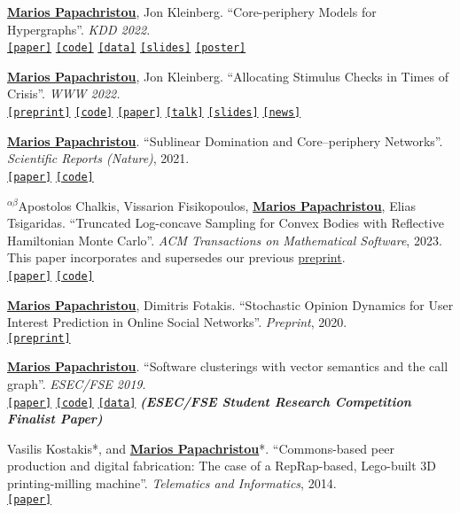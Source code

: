 \documentclass[margin]{res}
\newcommand{\alphabeticalorder}[0]{\ensuremath {^{\alpha \beta}}}
\newcommand{\specialurl}[2]{\href {#2} {\texttt{[#1]}}}
\newcommand{\preprint}[1]{\specialurl {preprint} {#1}}
\newcommand{\code}[1]{\specialurl {code} {#1}}
\newcommand{\data}[1]{\specialurl {data} {#1}}
\newcommand{\talk}[1]{\specialurl {talk} {#1}}
\newcommand{\slides}[1]{\specialurl {slides} {#1}}
\newcommand{\poster}[1]{\specialurl {poster} {#1}}
\newcommand{\paper}[1]{\specialurl {paper} {#1}}
\newcommand{\authorref}[1]{\underline {\textbf{#1}}}
\newcommand{\news}[1]{\specialurl {news} {#1}}
\newcommand{\authorme}{\authorref{Marios Papachristou}}
\begin{document}
\begin{resume}
\begin{compactenum}
   \item \authorme, Jon Kleinberg. ``Core-periphery Models for Hypergraphs''. \emph{KDD 2022.} \\
   \paper{https://arxiv.org/abs/2206.00783} \code{https://doi.org/10.5281/zenodo.5965849} \data{https://doi.org/10.5281/zenodo.5943043} \slides{https://drive.google.com/file/d/1k9pjPaeDtg7jhUivjlEmyunimcUb-DxL/view?usp=sharing} \poster{https://drive.google.com/file/d/1RJ3C7KKhTemfj5OBAiEXUHMVp-TJhTDs/view?usp=sharing}
   \item  \authorme, Jon Kleinberg. ``Allocating Stimulus Checks in Times of Crisis''. \emph{WWW 2022.} \\\preprint{https://arxiv.org/abs/2106.07560} \code{https://github.com/papachristoumarios/financial-contagion} \paper{https://doi.org/10.1145/3485447.3512047} \talk{https://youtu.be/WUmPBztK8Mo} \slides{https://drive.google.com/file/d/1v4v4jPOTzFtP8a5dhAFLoIjZSRDxAjBz/view?usp=sharing} \news{https://www.minneapolisfed.org/article/2022/social-policy-in-the-age-of-algorithms-an-interview-with-jon-kleinberg}   
   \item \authorme. ``Sublinear Domination and Core--periphery Networks''. \emph{Scientific Reports (Nature)}, 2021. \\ \paper{http://www.nature.com/articles/s41598-021-94105-8} \code{https://bit.ly/3wKNGI0} 
    \item \alphabeticalorder Apostolos Chalkis, Vissarion Fisikopoulos, \authorme, Elias Tsigaridas. ``Truncated Log-concave Sampling for Convex Bodies with Reflective Hamiltonian Monte Carlo''.   \emph{ACM Transactions on Mathematical Software}, 2023. This paper incorporates and supersedes our previous \href{https://arxiv.org/abs/2102.13068}{preprint}. \\ \paper{https://doi.org/10.1145/3589505} \code{https://github.com/GeomScale/volume_approximation}
    \item \authorme, Dimitris Fotakis. ``Stochastic Opinion Dynamics for User Interest Prediction in Online Social Networks''.  \emph{Preprint}, 2020. \\ \preprint{https://www.researchgate.net/publication/353006940_Stochastic_Opinion_Dynamics_for_Interest_Prediction_in_Social_Networks}
    \item \authorme. ``Software clusterings with vector semantics and the call graph''. \emph{ESEC/FSE 2019}. \\ \paper{https://dl.acm.org/citation.cfm?id=3342483} \code{https://github.com/papachristoumarios/sade} \data{http://doi.org/10.5281/zenodo.2652487} \textbf{\emph{(ESEC/FSE Student Research Competition Finalist Paper)}}
    \item Vasilis Kostakis*, and \authorme*. ``Commons-based peer production and digital fabrication: The case of a RepRap-based, Lego-built 3D printing-milling machine''. \emph{Telematics and Informatics}, 2014. \\ \paper{https://bit.ly/2JRoisV} 
    

\end{compactenum}
\end{resume}
\end{document}

